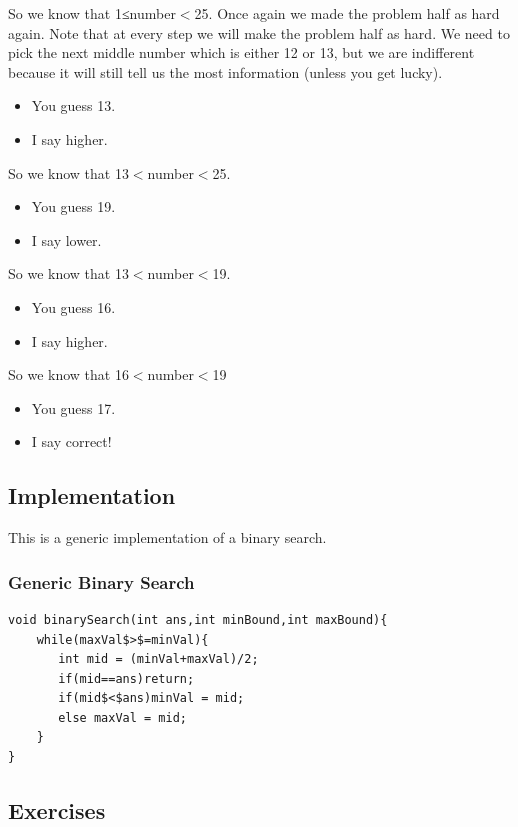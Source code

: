 \documentclass[11pt,oneside]{book}
\begin{document}
So we know that 1≤number$<$25. Once again we made the problem half as hard again. Note that at every step we will make the problem half as hard. We need to pick the next middle number which is either 12 or 13, but we are indifferent because it will still tell us the most information (unless you get lucky).

\begin{itemize}
\item You guess 13.
\item I say higher.
\end{itemize}

So we know that 13$<$number$<$25.

\begin{itemize}
\item You guess 19.
\item I say lower.
\end{itemize}

So we know that 13$<$number$<$19.

\begin{itemize}
\item You guess 16.
\item I say higher.
\end{itemize}

So we know that 16$<$number$<$19

\begin{itemize}
\item You guess 17.
\item I say correct!
\end{itemize}

\subsection{Implementation}

This is a generic implementation of a binary search.

\subsubsection{Generic Binary Search}

\begin{lstlisting}
void binarySearch(int ans,int minBound,int maxBound){
    while(maxVal$>$=minVal){
       int mid = (minVal+maxVal)/2;
       if(mid==ans)return;
       if(mid$<$ans)minVal = mid;
       else maxVal = mid;
    }
}
\end{lstlisting}

\subsection{Exercises}
\end{document}
